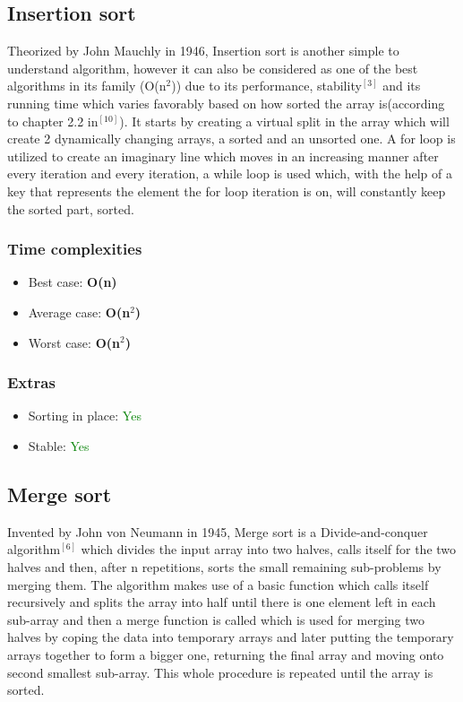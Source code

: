 \documentclass{article}
\begin{document}
\begin{multicols}{2}
\subsection{Insertion sort}
Theorized by John Mauchly in 1946, Insertion sort is another simple to understand algorithm, however it can also be considered as one of the best algorithms in its family (O(n$^2$)) due to its performance, stability$^{[3]}$ and its running time which varies favorably based on how sorted the array is(according to chapter 2.2 in$^{[10]}$). It starts by creating a virtual split in the array which will create 2 dynamically changing arrays, a sorted and an unsorted one. A for loop is utilized to create an imaginary line which moves in an increasing manner after every iteration and every iteration, a while loop is used which, with the help of a key that represents the element the for loop iteration is on, will constantly keep the sorted part, sorted. 
\subsubsection{Time complexities}
\begin{itemize}
    \item Best case: \textbf{O(n)}
    \item Average case: \textbf{O(n$^2$)}
    \item Worst case: \textbf{O(n$^2$)}
\end{itemize}

\subsubsection{Extras}
\begin{itemize}
    \item Sorting in place: \textcolor{green}{Yes}
    \item Stable: \textcolor{green}{Yes}
\end{itemize}


\bigbreak \bigbreak \bigbreak \bigbreak \bigbreak \bigbreak \bigbreak \bigbreak


\subsection{Merge sort}
Invented by John von Neumann in 1945, Merge sort is a Divide-and-conquer algorithm$^{[6]}$ which divides the input array into two halves, calls itself for the two halves and then, after n repetitions, sorts the small remaining sub-problems by merging them. The algorithm makes use of a basic function which calls itself recursively and splits the array into half until there is one element left in each sub-array and then a merge function is called which is used for merging two halves by coping the data into temporary arrays and later putting the temporary arrays together to form a bigger one, returning the final array and moving onto second smallest sub-array. This whole procedure is repeated until the array is sorted. 


\end{multicols}
\end{document}
